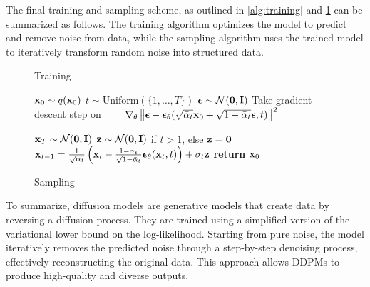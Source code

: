 The final training and sampling scheme, as outlined in \cref{alg:training} and \cref{alg:sampling} can be summarized as follows. The training algorithm optimizes the model to predict and remove noise from data, while the sampling algorithm uses the trained model to iteratively transform random noise into structured data.

\algrenewcommand\algorithmicindent{0.5em}%
\begin{figure}[t]
\begin{minipage}[t]{0.495\textwidth}
\begin{algorithm}[H]
  \caption{Training} \label{alg:training}
  \small
  \begin{algorithmic}[1]
    \Repeat
      \State $\boldsymbol{\mathbf{x}}_0 \sim q(\boldsymbol{\mathbf{x}}_0)$
      \State $t \sim \mathrm{Uniform}(\{1, \dotsc, T\})$
      \State $\boldsymbol{\mathbf{\epsilon}}\sim\mathcal{N}(\boldsymbol{\mathbf{0}},\boldsymbol{\mathbf{I}})$
      \State Take gradient descent step on
      \Statex $\qquad \nabla_\theta \left\| \boldsymbol{\mathbf{\epsilon}} - \boldsymbol{\mathbf{\epsilon}}_\theta(\sqrt{\bar\alpha_t} \boldsymbol{\mathbf{x}}_0 + \sqrt{1-\bar\alpha_t}\boldsymbol{\mathbf{\epsilon}}, t) \right\|^2$
  \end{algorithmic}
\end{algorithm}
\end{minipage}
\hfill
\begin{minipage}[t]{0.495\textwidth}
\begin{algorithm}[H]
  \caption{Sampling} \label{alg:sampling}
  \small
  \begin{algorithmic}[1]
    \vspace{.04in}
    \State $\boldsymbol{\mathbf{x}}_T \sim \mathcal{N}(\boldsymbol{\mathbf{0}}, \boldsymbol{\mathbf{I}})$
      \State $\boldsymbol{\mathbf{z}} \sim \mathcal{N}(\boldsymbol{\mathbf{0}}, \boldsymbol{\mathbf{I}})$ if $t > 1$, else $\boldsymbol{\mathbf{z}} = \boldsymbol{\mathbf{0}}$
      \State $\boldsymbol{\mathbf{x}}_{t-1} = \frac{1}{\sqrt{\alpha_t}}\left( \boldsymbol{\mathbf{x}}_t - \frac{1-\alpha_t}{\sqrt{1-\bar\alpha_t}} \boldsymbol{\mathbf{\epsilon}}_\theta(\boldsymbol{\mathbf{x}}_t, t) \right) + \sigma_t \boldsymbol{\mathbf{z}}$
    \EndFor
    \State \textbf{return} $\boldsymbol{\mathbf{x}}_0$
    \vspace{.04in}
  \end{algorithmic}
\end{algorithm}
\end{minipage}
\vspace{-1em}
\end{figure}

To summarize, diffusion models are generative models that create data by reversing a diffusion process. They are trained using a simplified version of the variational lower bound on the log-likelihood. Starting from pure noise, the model iteratively removes the predicted noise through a step-by-step denoising process, effectively reconstructing the original data. This approach allows DDPMs to produce high-quality and diverse outputs.

